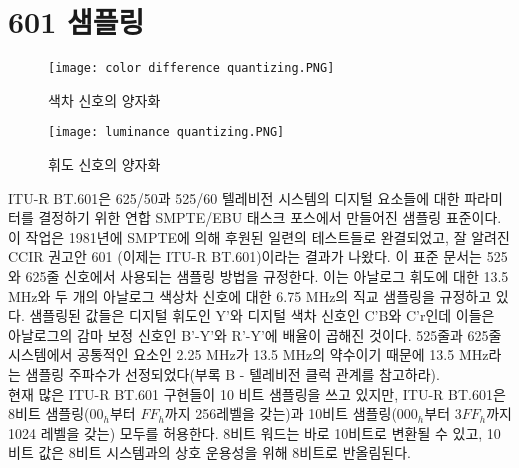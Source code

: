 \section{601 샘플링}
\begin{figure*}[t!]
    \centering
    \texttt{[image: color difference quantizing.PNG]}
    \caption{색차 신호의 양자화}\label{fig:color difference quantizing}
\end{figure*}
\begin{figure*}[h!]
    \centering
    \texttt{[image: luminance quantizing.PNG]}
    \caption{휘도 신호의 양자화}\label{fig:luminance quantizing}
\end{figure*}
ITU-R BT.601은 625/50과 525/60 텔레비전 시스템의 디지털 요소들에 대한 파라미터를 결정하기 위한 연합 SMPTE/EBU 태스크 포스에서 만들어진 샘플링 표준이다.
이 작업은 1981년에 SMPTE에 의해 후원된 일련의 테스트들로 완결되었고, 잘 알려진 CCIR 권고안 601 (이제는 ITU-R BT.601)이라는 결과가 나왔다.
이 표준 문서는 525와 625줄 신호에서 사용되는 샘플링 방법을 규정한다. 이는 아날로그 휘도에 대한 13.5 MHz와 두 개의 아날로그 색상차 신호에 대한 6.75 MHz의 직교 샘플링을 규정하고 있다.
샘플링된 값들은 디지털 휘도인 Y'와 디지털 색차 신호인 C'B와 C'r인데 이들은 아날로그의 감마 보정 신호인 B'-Y'와 R'-Y'에 배율이 곱해진 것이다.
525줄과 625줄 시스템에서 공통적인 요소인 2.25 MHz가 13.5 MHz의 약수이기 때문에 13.5 MHz라는 샘플링 주파수가 선정되었다(부록 B - 텔레비전 클럭 관계를 참고하라).
\\
현재 많은 ITU-R BT.601 구현들이 10 비트 샘플링을 쓰고 있지만, ITU-R BT.601은 8비트 샘플링($00_h$부터 $FF_h$까지 256레벨을 갖는)과 10비트 샘플링($000_h$부터 $3FF_h$까지 1024 레벨을 갖는) 모두를 허용한다.
8비트 워드는 바로 10비트로 변환될 수 있고, 10비트 값은 8비트 시스템과의 상호 운용성을 위해 8비트로 반올림된다.